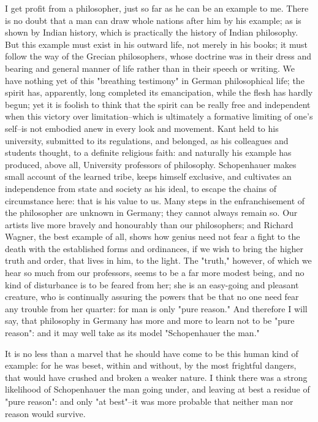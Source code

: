 I get profit from a philosopher, just so far as he can be an example
to me. There is no doubt that a man can draw whole nations after him
by his example; as is shown by Indian history, which is practically
the history of Indian philosophy. But this example must exist in his
outward life, not merely in his books; it must follow the way of the
Grecian philosophers, whose doctrine was in their dress and bearing
and general manner of life rather than in their speech or writing. We
have nothing yet of this "breathing testimony" in German
philosophical life; the spirit has, apparently, long completed its
emancipation, while the flesh has hardly begun; yet it is foolish to
think that the spirit can be really free and independent when this
victory over limitation--which is ultimately a formative limiting of
one's self--is not embodied anew in every look and movement. Kant
held to his university, submitted to its regulations, and belonged,
as his colleagues and students thought, to a definite religious
faith: and naturally his example has produced, above all, University
professors of philosophy. Schopenhauer makes small account of the
learned tribe, keeps himself exclusive, and cultivates an
independence from state and society as his ideal, to escape the
chains of circumstance here: that is his value to us. Many steps in
the enfranchisement of the philosopher are unknown in Germany; they
cannot always remain so. Our artists live more bravely and honourably
than our philosophers; and Richard Wagner, the best example of all,
shows how genius need not fear a fight to the death with the
established forms and ordinances, if we wish to bring the higher
truth and order, that lives in him, to the light. The "truth,"
however, of which we hear so much from our professors, seems to be a
far more modest being, and no kind of disturbance is to be feared
from her; she is an easy-going and pleasant creature, who is
continually assuring the powers that be that no one need fear any
trouble from her quarter: for man is only "pure reason." And
therefore I will say, that philosophy in Germany has more and more to
learn not to be "pure reason": and it may well take as its model
"Schopenhauer the man."

It is no less than a marvel that he should have come to be this human
kind of example: for he was beset, within and without, by the most
frightful dangers, that would have crushed and broken a weaker
nature. I think there was a strong likelihood of Schopenhauer the man
going under, and leaving at best a residue of "pure reason": and only
"at best"--it was more probable that neither man nor reason would
survive.

